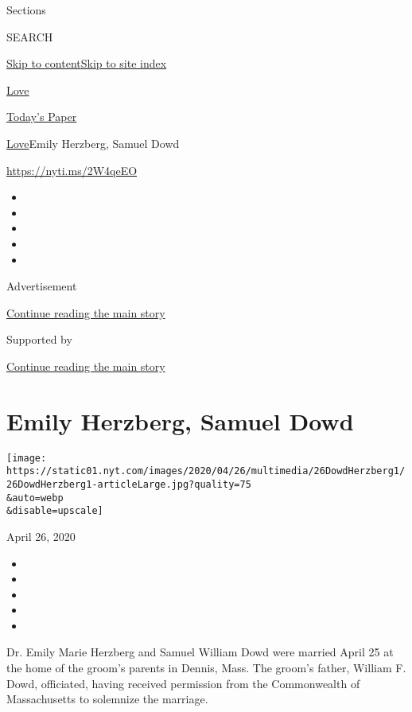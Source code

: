 Sections

SEARCH

\protect\hyperlink{site-content}{Skip to
content}\protect\hyperlink{site-index}{Skip to site index}

\href{https://www.nytimes.com/section/fashion/weddings}{Love}

\href{https://myaccount.nytimes.com/auth/login?response_type=cookie\&client_id=vi}{}

\href{https://www.nytimes.com/section/todayspaper}{Today's Paper}

\href{/section/fashion/weddings}{Love}\textbar{}Emily Herzberg, Samuel
Dowd

\url{https://nyti.ms/2W4qeEO}

\begin{itemize}
\item
\item
\item
\item
\item
\end{itemize}

Advertisement

\protect\hyperlink{after-top}{Continue reading the main story}

Supported by

\protect\hyperlink{after-sponsor}{Continue reading the main story}

\hypertarget{emily-herzberg-samuel-dowd}{%
\section{Emily Herzberg, Samuel Dowd}\label{emily-herzberg-samuel-dowd}}

\texttt{[image: https://static01.nyt.com/images/2020/04/26/multimedia/26DowdHerzberg1/26DowdHerzberg1-articleLarge.jpg?quality=75\\\&auto=webp\\\&disable=upscale]}

April 26, 2020

\begin{itemize}
\item
\item
\item
\item
\item
\end{itemize}

Dr. Emily Marie Herzberg and Samuel William Dowd were married April 25
at the home of the groom's parents in Dennis, Mass. The groom's father,
William F. Dowd, officiated, having received permission from the
Commonwealth of Massachusetts to solemnize the marriage.

